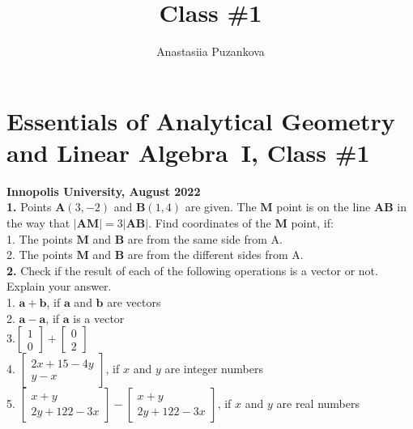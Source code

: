 \documentclass[a4paper,10pt]{article}
\title{Class \#1}
\author{Anastasiia Puzankova}
\date{}
\begin{document}

\section*{Essentials of Analytical Geometry and Linear Algebra~I, Class \#1}
\noindent\textbf{Innopolis University, August 2022}
\\

\textbf{1.} Points $\mathbf{A}(3,-2)$ and $\mathbf{B}(1,4)$ are given. The $ \mathbf{M}$ point is on the line $\mathbf{AB}$ in the way that
$|\mathbf{AM}| = 3|\mathbf{AB}|$. Find coordinates of the $ \mathbf{M}$ point, if: \\
1. The points $ \mathbf{M}$ and $ \mathbf{B}$ are from the same side from A. \\
2. The points $ \mathbf{M}$ and $ \mathbf{B}$ are from the different sides from A.\\

\textbf{2.} Check if the result of each of the following operations is a vector or not. Explain your answer. \\
1. $\mathbf{a} + \mathbf{b}$, if $\mathbf{a}$ and $\mathbf{b}$ are vectors \\
2. $\mathbf{a} - \mathbf{a}$, if $\mathbf{a}$ is a vector \\
3.$\begin{bmatrix}
  1 \\
  0 
 \end{bmatrix}
 + 
 \begin{bmatrix}
  0 \\
  2 
 \end{bmatrix}$ \\
4. $\begin{bmatrix}
  2x + 15 - 4y \\
  y - x 
 \end{bmatrix}$, if $x$ and $y$ are integer numbers \\
5. $\begin{bmatrix}
  x + y \\
  2y + 122 - 3x 
 \end{bmatrix} - 
 \begin{bmatrix}
  x + y \\
  2y + 122 - 3x 
 \end{bmatrix}$, if $x$ and $y$ are real numbers \\
\end{document}
